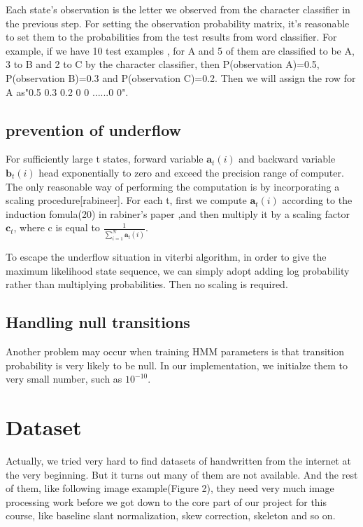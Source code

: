 \begin{enumerate}
Each state's observation is the letter we observed from the character classifier in the previous step. For setting the observation probability matrix, it's reasonable to set them to the probabilities from the test results from word classifier. For example, if we have 10 test examples , for A and 5 of them are classified to be A, 3 to B and 2 to C by the character classifier, then P(observation A)=0.5, P(observation B)=0.3 and P(observation C)=0.2. Then we will assign the row for A as"0.5 0.3 0.2 0 0 ......0 0".

\end{enumerate}

\subsection{prevention of underflow}

For sufficiently large t states, forward variable $\textbf{a}_t(i)$ and backward variable  $\textbf{b}_t(i)$ head exponentially to zero and exceed the precision range of computer. The only reasonable way of performing the computation is by incorporating a scaling procedure[rabineer].
For each t, first we compute $\textbf{a}_t(i)$ according to the induction fomula(20) in rabiner's paper \cite{Rabiner1989},and then multiply it by a scaling factor  $\textbf{c}_t$, where c is equal to $ \frac{1}{ \displaystyle\sum_{i=1}^N \textbf{a}_t(i)}$.

To escape the underflow situation in viterbi algorithm, in order to give the maximum likelihood state sequence, we can simply adopt adding log probability rather than multiplying probabilities. Then no scaling is required.

\subsection{Handling null transitions}
Another problem may occur when training HMM parameters is that transition probability is very likely to be null. In our implementation, we initialze them to very small number, such as \textbf{ $10^{-10}$}.

\section{Dataset}

Actually, we tried very hard to find datasets of handwritten from the internet at the very beginning. But it turns out many of them are not available. And the rest of them, like following image example(Figure 2), they need very much image processing work before we got down to the core part of our project for this course, like baseline slant normalization, skew correction, skeleton and so on.

